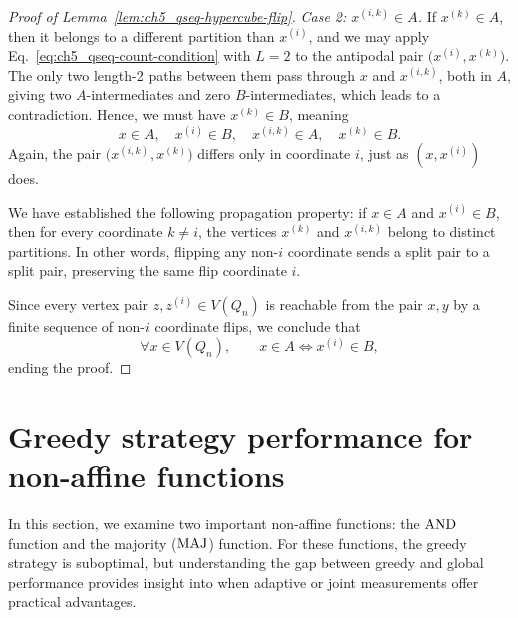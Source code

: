 \begin{proof}[Proof of Lemma~\ref{lem:ch5_qseq-hypercube-flip}]
    \medskip
    \noindent\textit{Case 2: $x^{(i,k)} \in A$.}
    If $x^{(k)} \in A$, then it belongs to a different partition than $x^{(i)}$, and we may apply Eq.~\eqref{eq:ch5_qseq-count-condition} with $L = 2$ to the antipodal pair $\bigl(x^{(i)}, x^{(k)}\bigr)$.
    The only two length-2 paths between them pass through $x$ and $x^{(i,k)}$, both in $A$, giving two $A$-intermediates and zero $B$-intermediates, which leads to a contradiction.
    Hence, we must have $x^{(k)} \in B$, meaning
    \begin{equation}
        x \in A, \quad x^{(i)} \in B, \quad x^{(i,k)} \in A, \quad x^{(k)} \in B.
    \end{equation}
    Again, the pair $\bigl(x^{(i,k)}, x^{(k)}\bigr)$ differs only in coordinate $i$, just as $(x, x^{(i)})$ does.

    \medskip
    \noindent We have established the following {propagation property}: if $x \in A$ and $x^{(i)} \in B$, then for every coordinate $k \neq i$, the vertices $x^{(k)}$ and $x^{(i,k)}$ belong to distinct partitions.
    In other words, flipping any non-$i$ coordinate sends a split pair to a split pair, preserving the same flip coordinate $i$.

    Since every vertex pair $z, z^{(i)} \in V(Q_n)$ is reachable from the pair $x, y$ by a finite sequence of non-$i$ coordinate flips, we conclude that
    \begin{equation}
        \forall x \in V(Q_n), \qquad x \in A \iff x^{(i)} \in B,
    \end{equation}
    ending the proof.
\end{proof}

\section{Greedy strategy performance for non-affine functions}\label{sec:ch5_qseq-non-affine-examples}

In this section, we examine two important non-affine functions: the $\mathrm{AND}$ function and the majority ($\mathrm{MAJ}$) function.
For these functions, the greedy strategy is suboptimal, but understanding the gap between greedy and global performance provides insight into when adaptive or joint measurements offer practical advantages.

